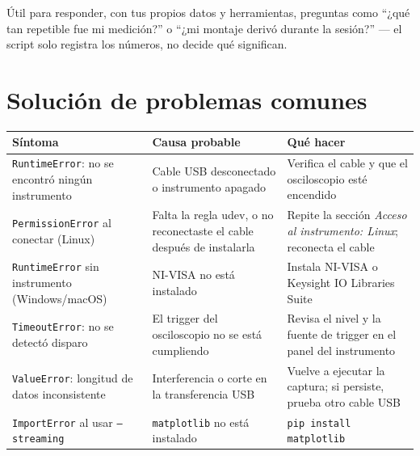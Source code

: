 \documentclass[11pt,a4paper]{article}
\begin{document}
Útil para responder, con tus propios datos y herramientas, preguntas como
``¿qué tan repetible fue mi medición?'' o ``¿mi montaje derivó durante la
sesión?'' --- el script solo registra los números, no decide qué
significan.

\section{Solución de problemas comunes}

\begin{center}
\begin{tabular}{@{}p{4.3cm}p{4.3cm}p{4.3cm}@{}}
\toprule
\textbf{Síntoma} & \textbf{Causa probable} & \textbf{Qué hacer} \\
\midrule
\texttt{RuntimeError}: no se encontró ningún instrumento &
  Cable USB desconectado o instrumento apagado &
  Verifica el cable y que el osciloscopio esté encendido \\[4pt]
\texttt{PermissionError} al conectar (Linux) &
  Falta la regla udev, o no reconectaste el cable después de instalarla &
  Repite la sección \emph{Acceso al instrumento: Linux}; reconecta el cable \\[4pt]
\texttt{RuntimeError} sin instrumento (Windows/macOS) &
  NI-VISA no está instalado &
  Instala NI-VISA o Keysight IO Libraries Suite \\[4pt]
\texttt{TimeoutError}: no se detectó disparo &
  El trigger del osciloscopio no se está cumpliendo &
  Revisa el nivel y la fuente de trigger en el panel del instrumento \\[4pt]
\texttt{ValueError}: longitud de datos inconsistente &
  Interferencia o corte en la transferencia USB &
  Vuelve a ejecutar la captura; si persiste, prueba otro cable USB \\[4pt]
\texttt{ImportError} al usar \texttt{--streaming} &
  \texttt{matplotlib} no está instalado &
  \texttt{pip install matplotlib} \\
\bottomrule
\end{tabular}
\end{center}

\end{document}

